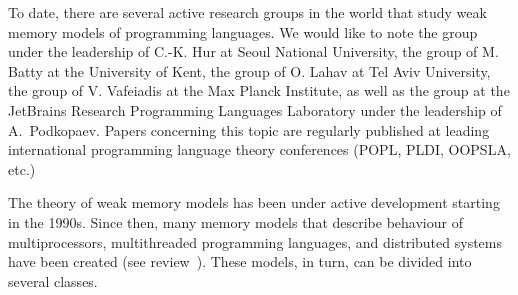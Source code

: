 {\progress}

To date, there are several active research groups in the world that study weak memory models of programming languages.
We would like to note the group under the leadership of C.-K. Hur at Seoul National University, the group of M. Batty at the University of Kent, the group of O. Lahav at Tel Aviv University, the group of V. Vafeiadis at the Max Planck Institute, as well as the group at the JetBrains Research Programming Languages Laboratory under the leadership of A.~Podkopaev.
Papers concerning this topic are regularly published at leading international programming language theory conferences (POPL, PLDI, OOPSLA, etc.)

The theory of weak memory models has been under active development starting in the 1990s. Since then, many memory models that describe behaviour of multiprocessors, multithreaded programming languages, and distributed systems have been created (see review~\cite{Moiseenko-al:PCS21}).
These models, in turn, can be divided into several classes.


